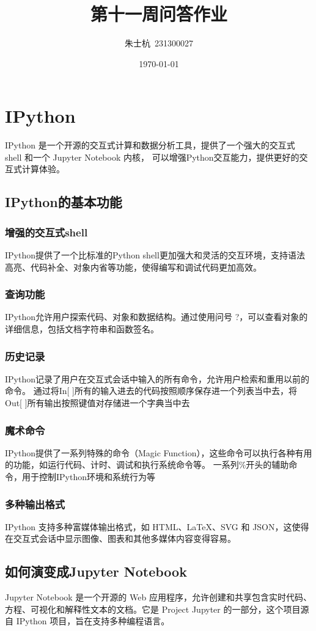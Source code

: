 \documentclass[10pt]{article}
\title{第十一周问答作业}
\author{朱士杭\ 231300027}
\date{\kaishu \today}
\begin{document}
	\maketitle
	\section{IPython}
	IPython 是一个开源的交互式计算和数据分析工具，提供了一个强大的交互式 shell 和一个 Jupyter Notebook 内核，
	可以增强Python交互能力，提供更好的交互式计算体验。
	\subsection{IPython的基本功能}
	\subsubsection{增强的交互式shell}IPython提供了一个比标准的Python shell更加强大和灵活的交互环境，支持语法高亮、代码补全、对象内省等功能，使得编写和调试代码更加高效。
	\subsubsection{查询功能}IPython允许用户探索代码、对象和数据结构。通过使用问号 ?，可以查看对象的详细信息，包括文档字符串和函数签名。
	\subsubsection{历史记录}IPython记录了用户在交互式会话中输入的所有命令，允许用户检索和重用以前的命令。
	通过将In[ ]所有的输入进去的代码按照顺序保存进一个列表当中去，将Out[ ]所有输出按照键值对存储进一个字典当中去
	\subsubsection{魔术命令}IPython提供了一系列特殊的命令（Magic Function），这些命令可以执行各种有用的功能，如运行代码、计时、调试和执行系统命令等。
	一系列\%开头的辅助命令，用于控制IPython环境和系统行为等
	\subsubsection{多种输出格式}IPython 支持多种富媒体输出格式，如 HTML、LaTeX、SVG 和 JSON，这使得在交互式会话中显示图像、图表和其他多媒体内容变得容易。
	\subsection{如何演变成Jupyter Notebook}
	Jupyter Notebook 是一个开源的 Web 应用程序，允许创建和共享包含实时代码、方程、可视化和解释性文本的文档。它是 Project Jupyter 的一部分，这个项目源自 IPython 项目，旨在支持多种编程语言。\par
\end{document}
